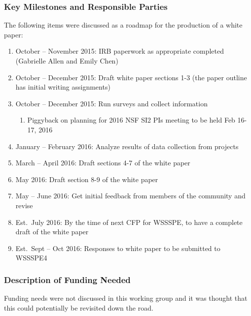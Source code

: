 \subsubsection{Key Milestones and Responsible Parties}

The following items were discussed as a roadmap for the production of a white
paper:
\begin{enumerate}
\item
October -- November 2015: IRB paperwork as appropriate completed (Gabrielle
Allen and Emily Chen)

\item
October -- December 2015: Draft white paper sections 1-3 (the paper outline has
initial writing assignments)

\item
October -- December 2015: Run surveys and collect information

\begin{enumerate}
\item
Piggyback on planning for 2016 NSF SI2 PIs meeting to be held Feb 16-17, 2016 
       
\end{enumerate}

\item
January -- February 2016: Analyze results of data collection from projects

\item
March -- April 2016: Draft sections 4-7 of the white paper

\item
May 2016: Draft section 8-9 of the white paper

\item
May -- June 2016: Get initial feedback from members of the community and revise

\item
Est.\ July 2016: By the time of next CFP for WSSSPE, to have a complete draft of
the white paper

\item
Est.\ Sept -- Oct 2016: Responses to white paper to be submitted to WSSSPE4

\end{enumerate}


\subsubsection{Description of Funding Needed}

Funding needs were not discussed in this working group and it was thought that
this could potentially be revisited down the road.



